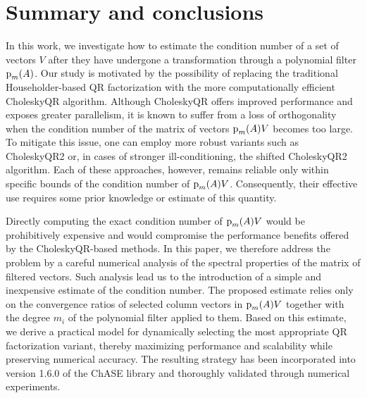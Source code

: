 \section{Summary and conclusions}
\label{sec-5}
In this work, we investigate how to estimate the condition number of a set of vectors $V$ after they have undergone a transformation through a polynomial filter ${\textrm p}_{m} (A)$. Our study is motivated by the possibility of replacing the traditional Householder-based QR factorization with the more computationally efficient CholeskyQR algorithm. Although CholeskyQR offers improved performance and exposes greater parallelism, it is known to suffer from a loss of orthogonality when the condition number of the matrix of vectors ${\textrm p}_{m} (A) V$ becomes too large. To mitigate this issue, one can employ more robust variants such as CholeskyQR2 or, in cases of stronger ill-conditioning, the shifted CholeskyQR2 algorithm. Each of these approaches, however, remains reliable only within specific bounds of the condition number of ${\textrm p}_{m} (A) V$. Consequently, their effective use requires some prior knowledge or estimate of this quantity.

Directly computing the exact condition number of ${\textrm p}_{m} (A) V$ would be prohibitively expensive and would compromise the performance benefits offered by the CholeskyQR-based methods. In this paper, we therefore address the problem by a careful numerical analysis of the spectral properties of the matrix of filtered vectors. Such analysis lead us to the introduction of a simple and inexpensive estimate of the condition number. The proposed estimate relies only on the convergence ratios of selected column vectors in ${\textrm p}_{m} (A) V$ together with the degree $m_i$ of the polynomial filter applied to them. Based on this estimate, we derive a practical model for dynamically selecting the most appropriate QR factorization variant, thereby maximizing performance and scalability while preserving numerical accuracy. The resulting strategy has been incorporated into version 1.6.0 of the ChASE library and thoroughly validated through numerical experiments.



